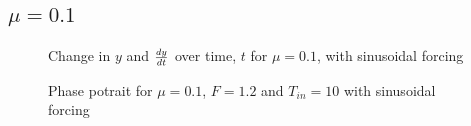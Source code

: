 \documentclass{article}
\begin{document}
\subsection{$\mu=0.1$}
\begin{figure}[H]
\centering 
\noindent{}%
\caption{Change in $y$ and $dy \over dt$  over time, $t$ for $\mu=0.1$, with sinusoidal forcing}
\end{figure}
\begin{figure}[H]
\centering 
\noindent{}%
\caption{Phase potrait for $\mu=0.1$, $F=1.2$ and $T_{in}=10$ with sinusoidal forcing}
\end{figure}
\end{document}
